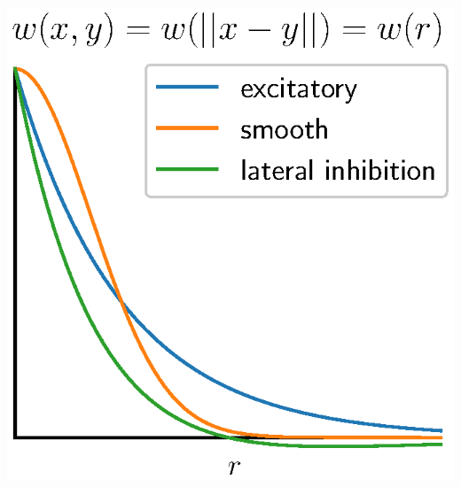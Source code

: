 \documentclass[paperwidth=40in,paperheight=32in,landscape]{baposter} %
\begin{document}
\begin{poster}
{\begin{center}
		\includegraphics[width=.9\linewidth, trim={0cm, .13cm, 0cm, 0cm}, clip=true]{images/kernels}
	\end{center}
}


\end{poster}
\end{document}
